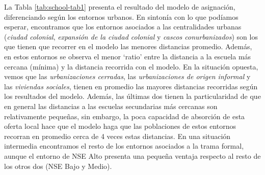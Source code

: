 \documentclass[
  spanish,
  a4paper,%
  chapterprefix=true,%
  DIV=calc,%
  twoside]{scrbook}%
\begin{document}
La Tabla \ref{tab:school-tab1} presenta el resultado del modelo de
asignación, diferenciando según los entornos urbanos. En sintonía con lo
que podíamos esperar, encontramos que los entornos asociados a las
centralidades urbanas (\emph{ciudad colonial}, \emph{expansión de la ciudad
colonial} y \emph{cascos conurbanizados}) son los que tienen que recorrer en
el modelo las menores distancias promedio. Además, en estos entornos se
observa el menor `ratio' entre la distancia a la escuela más cercana
(mínima) y la distancia recorrida con el modelo. En la situación
opuesta, vemos que las \emph{urbanizaciones cerradas}, las \emph{urbanizaciones de
origen informal} y las \emph{viviendas sociales}, tienen en promedio las
mayores distancias recorridas según los resultados del modelo. Además,
las últimas dos tienen la particularidad de que en general las
distancias a las escuelas secundarias más cercanas son relativamente
pequeñas, sin embargo, la poca capacidad de absorción de esta oferta
local hace que el modelo haga que las poblaciones de estos entornos
recorran en promedio cerca de 4 veces estas distancias. En una situación
intermedia encontramos el resto de los entornos asociados a la trama
formal, aunque el entorno de NSE Alto presenta una pequeña ventaja
respecto al resto de los otros dos (NSE Bajo y Medio).
\end{document}
